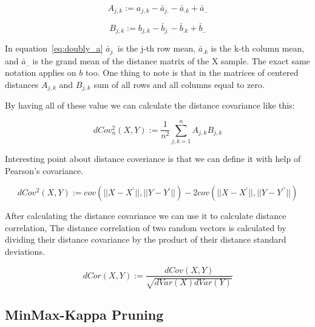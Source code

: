 \begin{equation}
\label{eq:doubly_a}
A_{j,k} := a_{j,k} - \bar{a}_{j.} - \bar{a}_{.k} + \bar{a}_{..}
\end{equation}

\begin{equation}
\label{eq:doubly_b}
B_{j,k} := b_{j,k} - \bar{b}_{j.} - \bar{b}_{.k} + \bar{b}_{..}
\end{equation}

In equation~\ref{eq:doubly_a} $\bar{a}_{j.}$ is the j-th row mean, $\bar{a}_{.k}$ is the k-th column mean, and $\bar{a}_{..}$ is the grand mean of the distance matrix of the X sample. The exact same notation applies on $b$ too. One thing to note is that in the matrices of centered distances $A_{j, k}$ and $B_{j,k}$  sum of all rows and all columns equal to zero.

By having all of these value we can calculate the distance covariance like this:

\begin{equation}
\label{eq:distance_covariance}
dCov_n^2 (X, Y) := \frac{1}{n^2} \sum_{j,k=1}^{n} A_{j,k}B_{j,k}
\end{equation}

Interesting point about distance coveriance is that we can define it with help of Pearson’s covariance.




\begin{equation}
\label{eq:distance_covariance_peasron}
dCov^2 (X, Y) := cov(|| X - X^{\prime}||, || Y - Y^{\prime}||) -  2cov(|| X - X^{\prime}||, || Y - Y^{\prime\prime}||)
\end{equation}

After calculating the distance covariance we can use it to calculate distance correlation, The distance correlation of two random vectors is calculated by dividing their distance covariance by the product of their distance standard deviations. 

\begin{equation}
\label{eq:distance_correlation}
dCor (X, Y) := \frac{dCov(X,Y)}{\sqrt{dVar(X)dVar(Y)}}
\end{equation}

\subsection{MinMax-Kappa Pruning}
\label{sub:minmax-kappa}


